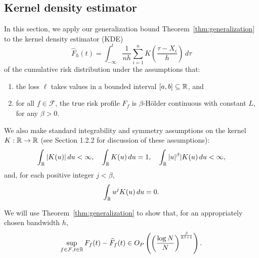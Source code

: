 \documentclass{article}
\begin{document}
%

%
%
%
%
%
%

%
%
%
%
%
%
%
%
%
%
%
%
%
%
%
%
%
%
%
%
%
%
%
%
%
%
%
%
%
%
%
%
%
%
%
%
%
%
%
%

\subsection{Kernel density estimator}

In this section, we apply our generalization bound Theorem~\eqref{thm:generalization} to the kernel density estimator (KDE)
\[\widehat F_h(t)
  = \int_{-\infty}^t \frac{1}{nh} \sum_{i = 1}^n K \left( \frac{\tau - X_i}{h} \right) \, d\tau\]
of the cumulative risk distribution under the assumptions that:
\begin{enumerate}
    \item the loss $\ell$ takes values in a bounded interval $[a, b] \subseteq \mathbb{R}$, and
    \item for all $f \in \mathcal{F}$, the true risk profile $F_f$ is $\beta$-H\"older continuous with constant $L$, for any $\beta > 0$. 
\end{enumerate}
We also make standard integrability and symmetry assumptions on the kernel $K : \mathbb{R} \to \mathbb{R}$ (see Section 1.2.2 \citep{tsybakov2004introduction} for discussion of these assumptions):
\[\int_{\mathbb{R}} |K(u)| \, du < \infty, \quad
  \int_{\mathbb{R}} K(u) \, du = 1, \quad
  \int_{\mathbb{R}} |u|^\beta |K(u) \, du < \infty,\]
and, for each positive integer $j < \beta$,
\begin{equation}
    \int_{\mathbb{R}} u^j K(u) \, du = 0.
    \label{eq:kernel_order_assumption}
\end{equation}

We will use Theorem~\ref{thm:generalization} to show that, for an appropriately chosen bandwidth $h$,
\[\sup_{f \in \mathcal{F}, t \in \mathbb{R}} F_f(t) - \widehat F_f(t)
  \in O_P \left( \left( \frac{\log N}{N} \right)^{\frac{\beta}{2\beta + 1}} \right).\]
\end{document}
